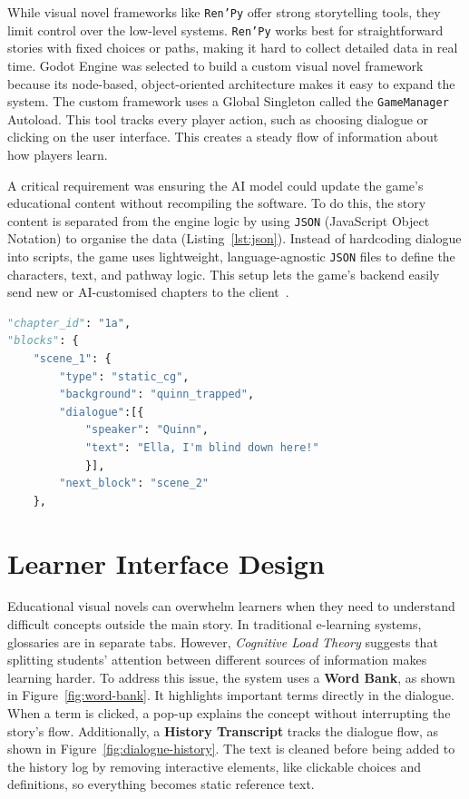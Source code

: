 \documentclass[12pt,a4paper]{report}
\begin{document}
\quad While visual novel frameworks like \texttt{Ren’Py} offer strong storytelling tools, they limit control over the low-level systems. \texttt{Ren’Py} works best for straightforward stories with fixed choices or paths, making it hard to collect detailed data in real time. Godot Engine was selected to build a custom visual novel framework because its node-based, object-oriented architecture makes it easy to expand the system. The custom framework uses a Global Singleton called the \texttt{GameManager} Autoload. This tool tracks every player action, such as choosing dialogue or clicking on the user interface. This creates a steady flow of information about how players learn.

\quad A critical requirement was ensuring the AI model could update the game's educational content without recompiling the software. To do this, the story content is separated from the engine logic by using \texttt{JSON} (JavaScript Object Notation) to organise the data (Listing~\ref{lst:json}). Instead of hardcoding dialogue into scripts, the game uses lightweight, language-agnostic \texttt{JSON} files to define the characters, text, and pathway logic. This setup lets the game's backend easily send new or AI-customised chapters to the client~\cite{SJ}.


\noindent\begin{minipage}{1\linewidth}
    \begin{lstlisting}[language=Python, caption=JSON Dialogue Block Structure, label=lst:json]
"chapter_id": "1a",
"blocks": {
    "scene_1": {
        "type": "static_cg",
        "background": "quinn_trapped",
        "dialogue":[{
            "speaker": "Quinn",
            "text": "Ella, I'm blind down here!"
            }],
        "next_block": "scene_2"
    },
    \end{lstlisting}
\end{minipage}


\section{Learner Interface Design}

\quad Educational visual novels can overwhelm learners when they need to understand difficult concepts outside the main story. In traditional e-learning systems, glossaries are in separate tabs. However, \textit{Cognitive Load Theory} suggests that splitting students' attention between different sources of information makes learning harder. To address this issue, the system uses a \textbf{Word Bank}, as shown in Figure~\ref{fig:word-bank}. It highlights important terms directly in the dialogue. When a term is clicked, a pop-up explains the concept without interrupting the story's flow. Additionally, a \textbf{History Transcript} tracks the dialogue flow, as shown in Figure~\ref{fig:dialogue-history}. The text is cleaned before being added to the history log by removing interactive elements, like clickable choices and definitions, so everything becomes static reference text.
\end{document}
